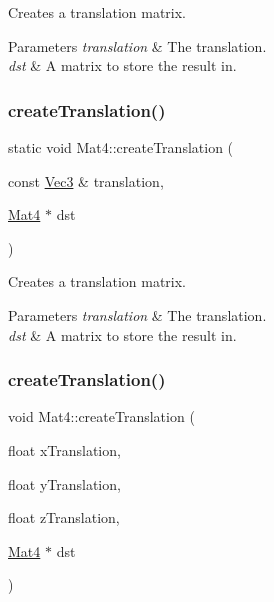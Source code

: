 Creates a translation matrix.


\begin{DoxyParams}{Parameters}
{\em translation} & The translation. \\
\hline
{\em dst} & A matrix to store the result in. \\
\hline
\end{DoxyParams}
\mbox{\label{classMat4_a10c09ee857ae1e074f4f66c44e5a477b}} 
\subsubsection{\texorpdfstring{create\+Translation()}{createTranslation()}\hspace{0.1cm}{\footnotesize\ttfamily [2/4]}}
{\footnotesize\ttfamily static void Mat4\+::create\+Translation (\begin{DoxyParamCaption}\item[{const \hyperlink{classVec3}{Vec3} \&}]{translation,  }\item[{\hyperlink{classMat4}{Mat4} $\ast$}]{dst }\end{DoxyParamCaption})\hspace{0.3cm}{\ttfamily [static]}}

Creates a translation matrix.


\begin{DoxyParams}{Parameters}
{\em translation} & The translation. \\
\hline
{\em dst} & A matrix to store the result in. \\
\hline
\end{DoxyParams}
\mbox{\label{classMat4_a4bd6bce87e0e3efbaa343898050bd47b}} 
\subsubsection{\texorpdfstring{create\+Translation()}{createTranslation()}\hspace{0.1cm}{\footnotesize\ttfamily [3/4]}}
{\footnotesize\ttfamily void Mat4\+::create\+Translation (\begin{DoxyParamCaption}\item[{float}]{x\+Translation,  }\item[{float}]{y\+Translation,  }\item[{float}]{z\+Translation,  }\item[{\hyperlink{classMat4}{Mat4} $\ast$}]{dst }\end{DoxyParamCaption})\hspace{0.3cm}{\ttfamily [static]}}

